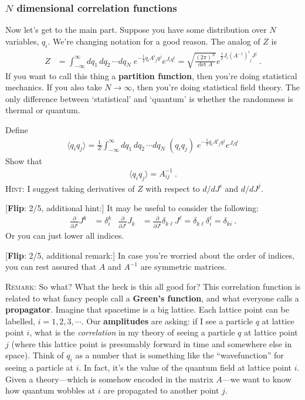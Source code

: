 \documentclass[12pt]{article}
\newcommand{\flip}[1]{{\color{red} [\textbf{Flip}: {#1}]}}
\begin{document}
\subsubsection{$N$ dimensional correlation functions}

Now let's get to the main part. Suppose you have some distribution over $N$ variables, $q_i$. We're changing notation for a good reason. The analog of $Z$ is
\begin{align}
	Z & = \int_{-\infty}^\infty dq_1\, dq_2\, \cdots dq_N \;
	e^{-\frac 12 q_i A^i_{\phantom{i}j} q^j}
	e^{J_i q^i}
	= 
	\sqrt{\frac{(2\pi)^N}{\text{det }A}} e^{\frac 12 J_i (A^{-1})^i_{\phantom{i}j} J^j} \ .
\end{align}
If you want to call this thing a \textbf{partition function}, then you're doing statistical mechanics. If you also take $N\to \infty$, then you're doing statistical field theory. The only difference between `statistical' and `quantum' is whether the randomness is thermal or quantum.

Define
\begin{align}
	\langle q_i q_j \rangle = \frac{1}{Z}  
	\int_{-\infty}^\infty dq_1\, dq_2\, \cdots dq_N \;
	\left(q_i q_j\right)
	\;
	e^{-\frac 12 q_i A^i_{\phantom{i}j} q^j}
	e^{J_i q^i}
\end{align}
Show that
\begin{align}
	\langle q_i q_j \rangle = A^{-1}_{ij} \ .
\end{align}
\textsc{Hint}: I suggest taking derivatives of $Z$ with respect to $d/dJ^i$ and $d/dJ^j$. 

\flip{2/5, additional hint:} It may be useful to consider the following:
\begin{align}
	\frac{\partial}{\partial J^i} J^k &= \delta^k_i 
	&
	\frac{\partial}{\partial J^i} J_k &= 
	\frac{\partial}{\partial J^i}
	 \delta_{k\ell}J^\ell
	= \delta_{k\ell} \delta^\ell_i 
	= \delta_{ki} \ .
\end{align}
Or you can just lower all indices. 

\flip{2/5, additional remark:} In case you're worried about the order of indices, you can rest assured that $A$ and $A^{-1}$ are symmetric matrices.

\textsc{Remark}: So what? What the heck is this all good for? This correlation function is related to what fancy people call a \textbf{Green's function}, and what everyone calls a \textbf{propagator}. Imagine that spacetime is a big lattice. Each lattice point can be labelled, $i=1,2,3,\cdots$. 
%
Our \textbf{amplitudes} are asking: if I see a particle $q$ at lattice point $i$, what is the \emph{correlation} in my theory of seeing a particle $q$ at lattice point $j$ (where this lattice point is presumably forward in time and somewhere else in space).  Think of $q_i$ as a number that is something like the ``wavefunction'' for seeing a particle at $i$. In fact, it's the value of the quantum field at lattice point $i$. Given a theory---which is somehow encoded in the matrix $A$---we want to know how quantum wobbles at $i$ are propagated to another point $j$.
\end{document}
